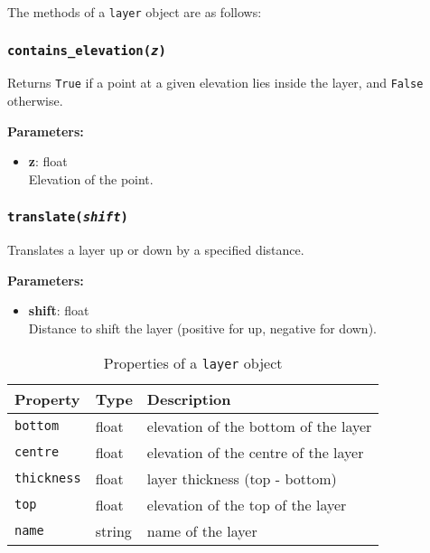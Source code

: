 The methods of a \texttt{layer} object are as follows:

\subsubsection{\texttt{contains\_elevation(\emph{z})}}

Returns \texttt{True} if a point at a given elevation lies inside the layer, and \texttt{False} otherwise.

\textbf{Parameters:}
\begin{itemize}
\item \textbf{z}: float\\
   Elevation of the point.
\end{itemize}

\subsubsection{\texttt{translate(\emph{shift})}}

Translates a layer up or down by a specified distance.

\textbf{Parameters:}
\begin{itemize}
\item \textbf{shift}: float\\
  Distance to shift the layer (positive for up, negative for down).
\end{itemize}

\begin{table}
  \begin{center}
    \begin{tabular}{|l|l|l|}
      \hline
      \textbf{Property} & \textbf{Type} & \textbf{Description}\\
      \hline
      \texttt{bottom} & float & elevation of the bottom of the layer \\
      \texttt{centre} & float & elevation of the centre of the layer \\
      \texttt{thickness} & float & layer thickness (top - bottom) \\
      \texttt{top} & float & elevation of the top of the layer \\
      \texttt{name} & string & name of the layer \\
      \hline
    \end{tabular}
    \caption{Properties of a \texttt{layer} object}
    \label{tb:layer_properties}
  \end{center}
\end{table}

